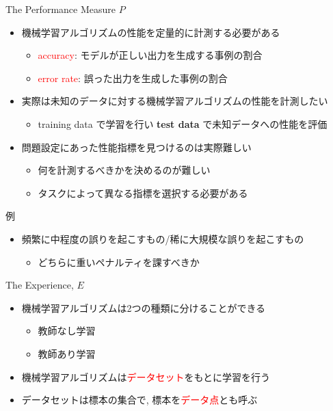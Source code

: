 \documentclass[dvipdfmx, 10pt]{beamer}
\newcommand{\red}[1]{\textcolor{red}{#1}}
\newcommand{\green}[1]{\textcolor{green!40!black}{#1}}
\begin{document}
\begin{frame}{The Performance Measure $P$}
  \begin{itemize}
    \item 機械学習アルゴリズムの性能を定量的に計測する必要がある
    \begin{itemize}
      \item \red{accuracy}: モデルが正しい出力を生成する事例の割合
      \item \red{error rate}: 誤った出力を生成した事例の割合
    \end{itemize}
    \item 実際は未知のデータに対する機械学習アルゴリズムの性能を計測したい
    \begin{itemize}
      \item training data で学習を行い {\bf test data} で未知データへの性能を評価
    \end{itemize}
    \item 問題設定にあった性能指標を見つけるのは実際難しい
    \begin{itemize}
      \item 何を計測するべきかを決めるのが難しい
      \item タスクによって異なる指標を選択する必要がある
    \end{itemize}
  \end{itemize}
  \begin{exampleblock}{例}
	\begin{itemize}
	\item 頻繁に中程度の誤りを起こすもの/稀に大規模な誤りを起こすもの
		\begin{itemize}
		\item どちらに重いペナルティを課すべきか
		\end{itemize}
	\end{itemize}
  \end{exampleblock}
\end{frame}


\begin{frame}{The Experience, $E$}
  \begin{itemize}
    \item 機械学習アルゴリズムは2つの種類に分けることができる
      \begin{itemize}
        \item 教師なし学習
        \item 教師あり学習
      \end{itemize}
    \item 機械学習アルゴリズムは\textcolor{red}{データセット}をもとに学習を行う
    \item データセットは標本の集合で, 標本を\textcolor{red}{データ点}とも呼ぶ
  \end{itemize}
\end{frame}
\end{document}
